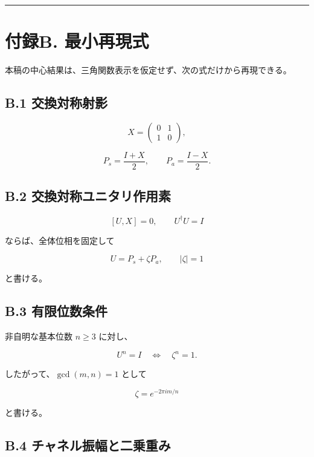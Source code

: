 \documentclass[
  a4paper,
  10pt]{article}
\begin{document}
\begin{center}\rule{0.5\linewidth}{0.5pt}\end{center}

\section{付録B.
最小再現式}\label{ux4ed8ux9332b-ux6700ux5c0fux518dux73feux5f0f}

本稿の中心結果は、三角関数表示を仮定せず、次の式だけから再現できる。

\subsection{B.1
交換対称射影}\label{b1-ux4ea4ux63dbux5bfeux79f0ux5c04ux5f71}

\[
X=
\begin{pmatrix}
0&1\\
1&0
\end{pmatrix},
\]

\[
P_s=\frac{I+X}{2},
\qquad
P_a=\frac{I-X}{2}.
\]

\subsection{B.2
交換対称ユニタリ作用素}\label{b2-ux4ea4ux63dbux5bfeux79f0ux30e6ux30cbux30bfux30eaux4f5cux7528ux7d20}

\[
[U,X]=0,
\qquad
U^\dagger U=I
\]

ならば、全体位相を固定して

\[
\boxed{
U=P_s+\zeta P_a,
\qquad |\zeta|=1
}
\]

と書ける。

\subsection{B.3
有限位数条件}\label{b3-ux6709ux9650ux4f4dux6570ux6761ux4ef6}

非自明な基本位数 \(n\ge3\) に対し、

\[
U^n=I
\quad\Longleftrightarrow\quad
\zeta^n=1.
\]

したがって、\(\gcd(m,n)=1\) として

\[
\zeta=e^{-2\pi im/n}
\]

と書ける。

\subsection{B.4
チャネル振幅と二乗重み}\label{b4-ux30c1ux30e3ux30cdux30ebux632fux5e45ux3068ux4e8cux4e57ux91cdux307f}
\end{document}

